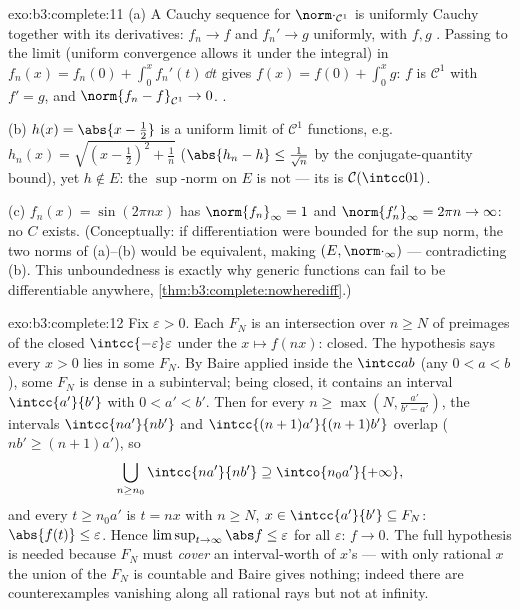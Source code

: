 \begin{solution}{exo:b3:complete:11}
(a) A Cauchy sequence for $\norm\cdot_{\mathcal C^1}$ is
uniformly Cauchy together with its derivatives: $f_n \to f$
and $f_n' \to g$ uniformly, with $f, g$ . Passing
to the limit (uniform convergence allows it under the
integral) in $f_n(x) = f_n(0) + \int_0^xf_n'(t)\,\dd t$
gives $f(x) = f(0) + \int_0^xg$: $f$ is $\mathcal C^1$ with
$f' = g$, and $\norm{f_n - f}_{\mathcal C^1} \to 0$.
.

(b) $h(x) = \abs{x - \frac12}$ is a uniform limit of
$\mathcal C^1$ functions, e.g.\ $h_n(x) = \sqrt{(x -
\frac12)^2 + \frac1n}$ ($\abs{h_n - h} \leq \frac1{\sqrt n}$
by the conjugate-quantity bound), yet $h \notin E$: the
$\sup$-norm on $E$ is not  --- its  is
$\mathcal C(\intcc01)$.

(c) $f_n(x) = \sin(2\pi nx)$ has $\norm{f_n}_\infty = 1$ and
$\norm{f_n'}_\infty = 2\pi n \to \infty$: no $C$ exists.
(Conceptually: if differentiation were bounded for the sup
norm, the two norms of (a)--(b) would be equivalent, making
$(E, \norm\cdot_\infty)$  --- contradicting (b).
This unboundedness is exactly why generic 
functions can fail to be differentiable anywhere,
\cref{thm:b3:complete:nowherediff}.)
\end{solution}

\begin{solution}{exo:b3:complete:12}
Fix $\varepsilon > 0$. Each $F_N$ is an intersection over $n
\geq N$ of preimages of the closed $\intcc{-\varepsilon}
\varepsilon$ under the  $x \mapsto f(nx)$: closed.
The hypothesis says every $x > 0$ lies in some $F_N$. By
Baire applied inside the  $\intcc ab$ (any $0 < a <
b$), some $F_N$ is dense in a subinterval; being closed, it
contains an interval $\intcc{a'}{b'}$ with $0 < a' < b'$.
Then for every $n \geq \max(N, \frac{a'}{b' - a'})$, the
intervals $\intcc{na'}{nb'}$ and $\intcc{(n+1)a'}{(n+1)b'}$
overlap ($nb' \geq (n+1)a'$), so
\[
\bigcup_{n \geq n_0}\intcc{na'}{nb'} \supseteq
\intco{n_0a'}{+\infty},
\]
and every $t \geq n_0a'$ is $t = nx$ with $n \geq N$, $x \in
\intcc{a'}{b'} \subseteq F_N$: $\abs{f(t)} \leq \varepsilon$.
Hence $\limsup_{t\to\infty}\abs f \leq \varepsilon$ for all
$\varepsilon$: $f \to 0$. The full hypothesis is needed
because $F_N$ must \emph{cover} an interval-worth of $x$'s
--- with only rational $x$ the union of the $F_N$ is
countable and Baire gives nothing; indeed there are
 counterexamples vanishing along all rational
rays but not at infinity.
\end{solution}

